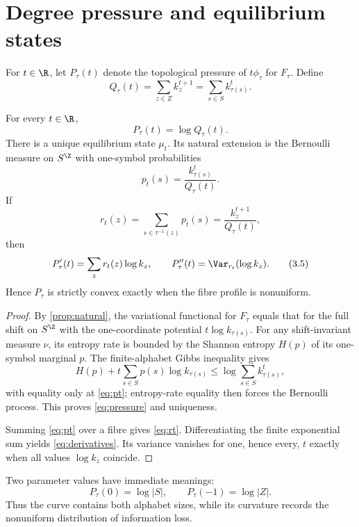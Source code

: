 \section{Degree pressure and equilibrium states}\label{sec:pressure}

For $t\in\R$, let $P_\tau(t)$ denote the topological pressure of
$t\phi_\tau$ for $F_\tau$.  Define
\[
 Q_\tau(t)=\sum_{z\in Z}k_z^{t+1}
 =\sum_{s\in S}k_{\tau(s)}^t.
 \tag{3.1}\label{eq:q}
\]

\begin{theorem}\label{thm:pressure}
For every $t\in\R$,
\[
 P_\tau(t)=\log Q_\tau(t).
 \tag{3.2}\label{eq:pressure}
\]
There is a unique equilibrium state $\mu_t$.  Its natural extension is the
Bernoulli measure on $S^\Z$ with one-symbol probabilities
\[
 p_t(s)=\frac{k_{\tau(s)}^t}{Q_\tau(t)}.
 \tag{3.3}\label{eq:pt}
\]
If
\[
 r_t(z)=\sum_{s\in\tau^{-1}(z)}p_t(s)
 =\frac{k_z^{t+1}}{Q_\tau(t)},
 \tag{3.4}\label{eq:rt}
\]
then
\[
 P_\tau'(t)=\sum_z r_t(z)\log k_z,
 \qquad
 P_\tau''(t)=\Var_{r_t}(\log k_z).
 \tag{3.5}\label{eq:derivatives}
\]
Hence $P_\tau$ is strictly convex exactly when the fibre profile is
nonuniform.
\end{theorem}

\begin{proof}
By \cref{prop:natural}, the variational functional for $F_\tau$ equals that
for the full shift on $S^\Z$ with the one-coordinate potential
$t\log k_{\tau(s)}$.  For any shift-invariant measure $\nu$, its entropy rate
is bounded by the Shannon entropy $H(p)$ of its one-symbol marginal $p$.
The finite-alphabet Gibbs inequality gives
\[
 H(p)+t\sum_{s\in S}p(s)\log k_{\tau(s)}
 \leq\log\sum_{s\in S}k_{\tau(s)}^t,
 \tag{3.6}\label{eq:gibbs}
\]
with equality only at \eqref{eq:pt}; entropy-rate equality then forces the
Bernoulli process.  This proves \eqref{eq:pressure} and uniqueness.

Summing \eqref{eq:pt} over a fibre gives \eqref{eq:rt}.  Differentiating the
finite exponential sum yields \eqref{eq:derivatives}.  Its variance vanishes
for one, hence every, $t$ exactly when all values $\log k_z$ coincide.
\end{proof}

Two parameter values have immediate meanings:
\[
 P_\tau(0)=\log|S|,
 \qquad
 P_\tau(-1)=\log|Z|.
 \tag{3.7}\label{eq:end-alphabets}
\]
Thus the curve contains both alphabet sizes, while its curvature records
the nonuniform distribution of information loss.

